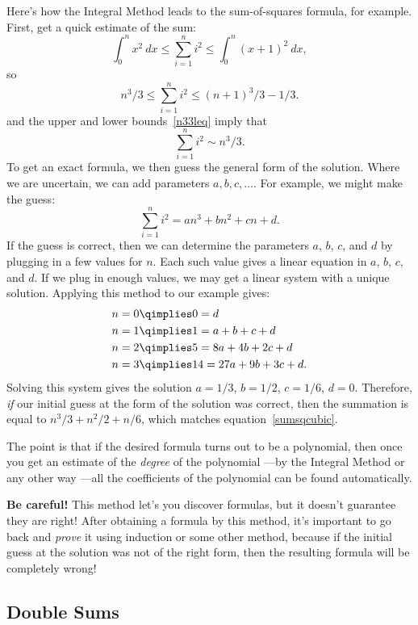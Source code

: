 Here's how the Integral Method leads to the sum-of-squares formula, for
example.  First, get a quick estimate of the sum:
\[
\int_0^n x^2 \ dx \leq \sum_{i=1}^n i^2 \leq \int_0^n (x+1)^2 \ dx,
\]
so
\begin{equation}\label{n33leq}
n^3/3     \leq \sum_{i=1}^n i^2 \leq (n+1)^3/3 - 1/3.
\end{equation}
and the upper and lower bounds~\eqref{n33leq} imply that
\[
\sum_{i=1}^n i^2 \sim n^3/3.
\]
To get an exact formula, we then guess the general form of the solution.
Where we are uncertain, we can add parameters $a, b, c, \dots$.  For
example, we might make the guess:
\[
\sum_{i=1}^n i^2 = an^3 + bn^2 + cn + d.
\]
If the guess is correct, then we can determine the parameters $a$,
$b$, $c$, and $d$ by plugging in a few values for $n$.  Each such
value gives a linear equation in $a$, $b$, $c$, and $d$.  If we plug
in enough values, we may get a linear system with a unique solution.
Applying this method to our example gives:
\begin{align*}
n = 0 & \qimplies  0 = d \\
n = 1 & \qimplies  1 = a + b + c + d \\
n = 2 & \qimplies  5 = 8a + 4b + 2c + d \\
n = 3 & \qimplies  14 = 27a + 9b + 3c + d.
\end{align*}
Solving this system gives the solution $a = 1/3$, $b = 1/2$, $c = 1/6$, $d
= 0$.  Therefore, \emph{if} our initial guess at the form of the solution
was correct, then the summation is equal to $n^3/3 + n^2/2 + n/6$, which
matches equation~\eqref{sumsqcubic}.

The point is that if the desired formula turns out to be a polynomial,
then once you get an estimate of the \emph{degree} of the polynomial ---by
the Integral Method or any other way ---all the coefficients of the
polynomial can be found automatically.

\textbf{Be careful!}  This method let's you discover formulas, but it
doesn't guarantee they are right!  After obtaining a formula by this
method, it's important to go back and \emph{prove} it using induction or
some other method, because if the initial guess at the solution was not of
the right form, then the resulting formula will be completely wrong!

\subsection{Double Sums}

